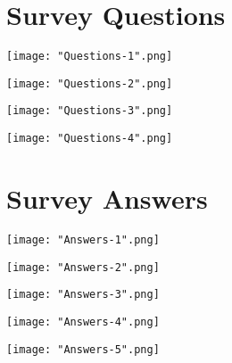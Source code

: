 \documentclass[sigconf,obeyspaces]{acmart}
\begin{document}
\nocite{*}
\sloppy
\printbibliography
\fussy

\newpage
\onecolumn
\appendix 
\section{Survey Questions} \label{appendix}
\begin{center}
    \hspace*{-0.48cm}
    \texttt{[image: "Questions-1".png]}
\end{center}
\begin{center}
    \vspace*{-1.5cm}
    \hspace*{-0.6cm}
    \texttt{[image: "Questions-2".png]}
\end{center}
\begin{center}
    \vspace*{-1.8cm}
    \hspace*{-0.5cm}
    \texttt{[image: "Questions-3".png]}
\end{center}
\begin{center}
    \vspace*{-1.5cm}
    \hspace*{0.5cm}
    \texttt{[image: "Questions-4".png]}
\end{center}

\newpage
\section{Survey Answers}
\begin{center}
    \vspace*{1.2cm}
    \hspace*{-0.2cm}
    \texttt{[image: "Answers-1".png]}
\end{center}
\begin{center}
    \vspace*{-1.5cm}
    \hspace*{-0.2cm}
    \texttt{[image: "Answers-2".png]}
\end{center}
\begin{center}
    \vspace*{-1.5cm}
    \hspace*{0.3cm}
    \texttt{[image: "Answers-3".png]}
\end{center}
\begin{center}
    \vspace*{-1.5cm}
    \hspace*{0.7cm}
    \texttt{[image: "Answers-4".png]}
\end{center}
\begin{center}
    \vspace*{-1.0cm}
    \hspace*{0.7cm}
    \texttt{[image: "Answers-5".png]}
\end{center}
\end{document}

